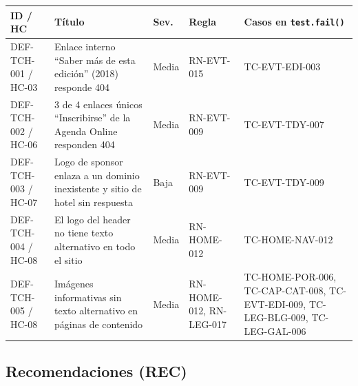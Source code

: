 \documentclass[11pt,a4paper]{article}
\begin{document}
{\footnotesize
\begin{xltabular}{\textwidth}{@{}l X l >{\raggedright\arraybackslash}p{0.15\textwidth} >{\raggedright\arraybackslash}p{0.19\textwidth}@{}}
\toprule
ID / HC & Título & Sev. & Regla & Casos en \texttt{test.fail()} \\
\midrule
\endhead
DEF-TCH-001 / HC-03 & Enlace interno ``Saber más de esta edición'' (2018) responde 404 & Media & RN-EVT-015 & TC-EVT-EDI-003 \\
DEF-TCH-002 / HC-06 & 3 de 4 enlaces únicos ``Inscribirse'' de la Agenda Online responden 404 & Media & RN-EVT-009 & TC-EVT-TDY-007 \\
DEF-TCH-003 / HC-07 & Logo de sponsor enlaza a un dominio inexistente y sitio de hotel sin respuesta & Baja & RN-EVT-009 & TC-EVT-TDY-009 \\
DEF-TCH-004 / HC-08 & El logo del header no tiene texto alternativo en todo el sitio & Media & RN-HOME-012 & TC-HOME-NAV-012 \\
DEF-TCH-005 / HC-08 & Imágenes informativas sin texto alternativo en páginas de contenido & Media & RN-HOME-012, RN-LEG-017 & TC-HOME-POR-006, TC-CAP-CAT-008, TC-EVT-EDI-009, TC-LEG-BLG-009, TC-LEG-GAL-006 \\
\bottomrule
\end{xltabular}
}

\subsection{Recomendaciones (REC)}
\end{document}
